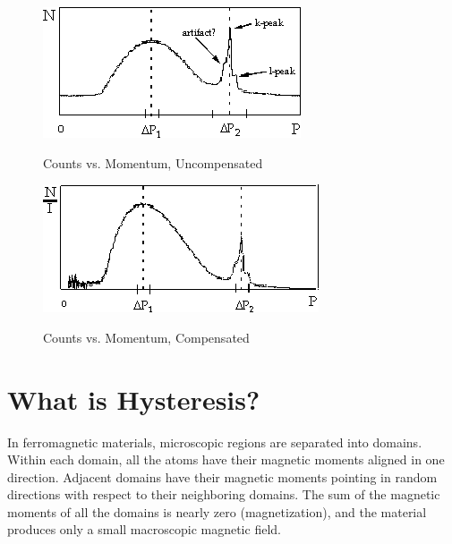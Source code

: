 \documentclass{../lab}
\begin{document}
\begin{figure}[h]
\begin{minipage}[t]{.5\textwidth}
    \centering
    \href{http://experimentationlab.berkeley.edu/sites/default/files/images/BRAimage008.gif}{\includegraphics[width=0.9\linewidth,keepaspectratio]{images/BRAimage008.png}}
    \caption{Counts vs. Momentum, Uncompensated}
    \label{fig:CountsVsMomentumUncompensated}
\end{minipage}%
\begin{minipage}[t]{.5\textwidth}
    \centering
    \href{http://experimentationlab.berkeley.edu/sites/default/files/images/BRAimage009.gif}{\includegraphics[width=0.9\linewidth,keepaspectratio]{images/BRAimage009.png}}
    \caption{Counts vs. Momentum, Compensated}
    \label{fig:CountsVsMomentumCompensated}
\end{minipage}
\end{figure}

\section{What is Hysteresis?}

In ferromagnetic materials, microscopic regions are separated into domains. Within each domain, all the atoms have their magnetic moments aligned in one direction. Adjacent domains have their magnetic moments pointing in random directions with respect to their neighboring domains. The sum of the magnetic moments of all the domains is nearly zero (magnetization), and the material produces only a small macroscopic magnetic field.
\end{document}
